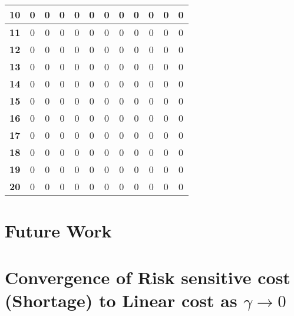 \documentclass[11pt,a4paper,oneside]{report}
\begin{document}
\begin{table}[H]
\begin{tabular}{|c|c|c|c|c|c|c|c|c|c|c|c|}
\textbf{10}     & 0          & 0          & 0          & 0          & 0          & 0          & 0          & 0          & 0          & 0          & 0           \\ \hline
\textbf{11}     & 0          & 0          & 0          & 0          & 0          & 0          & 0          & 0          & 0          & 0          & 0           \\ \hline
\textbf{12}     & 0          & 0          & 0          & 0          & 0          & 0          & 0          & 0          & 0          & 0          & 0           \\ \hline
\textbf{13}     & 0          & 0          & 0          & 0          & 0          & 0          & 0          & 0          & 0          & 0          & 0           \\ \hline
\textbf{14}     & 0          & 0          & 0          & 0          & 0          & 0          & 0          & 0          & 0          & 0          & 0           \\ \hline
\textbf{15}     & 0          & 0          & 0          & 0          & 0          & 0          & 0          & 0          & 0          & 0          & 0           \\ \hline
\textbf{16}     & 0          & 0          & 0          & 0          & 0          & 0          & 0          & 0          & 0          & 0          & 0           \\ \hline
\textbf{17}     & 0          & 0          & 0          & 0          & 0          & 0          & 0          & 0          & 0          & 0          & 0           \\ \hline
\textbf{18}     & 0          & 0          & 0          & 0          & 0          & 0          & 0          & 0          & 0          & 0          & 0           \\ \hline
\textbf{19}     & 0          & 0          & 0          & 0          & 0          & 0          & 0          & 0          & 0          & 0          & 0           \\ \hline
\textbf{20}     & 0          & 0          & 0          & 0          & 0          & 0          & 0          & 0          & 0          & 0          & 0           \\ \hline
\end{tabular}
\end{table}

\chapter{Future Work}
\nocite{*}


\appendix
\chapter{Convergence of Risk sensitive cost (Shortage) to Linear cost as $\gamma\rightarrow 0$}

\end{document}
